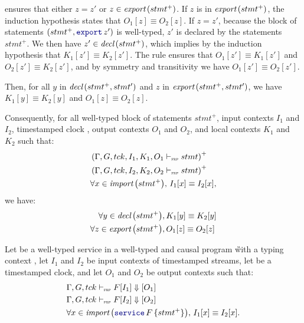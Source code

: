 \begin{skippableproof}
\begin{itemize}
\begin{itemize}
                         ensures that
                        either $z = z'$ or $z \in \exportSet{stmt^+}$.
                        If $z$ is in $\exportSet{stmt^+}$, the induction hypothesis states that
                        $O_1[z] \equiv O_2[z]$.
                        If $z = z'$, because the block of statements $(stmt^+, \export{z'})$ is
                        well-typed, $z'$ is declared by the statements $stmt^+$. We then have $z'
                            \in \declSet{stmt^+}$, which implies by the induction hypothesis that
                        $K_1[z'] \equiv K_2[z']$. The rule  ensures that $O_1[z'] \equiv K_1[z']$ and $O_2[z'] \equiv
                            K_2[z']$, and by symmetry and transitivity we have $O_1[z'] \equiv
                            O_2[z']$.
              \end{itemize}

              Then, for all $y$ in $\declSet{stmt^+, stmt'}$ and $z$ in $\exportSet{stmt^+, stmt'}$,
              we have $K_1[y] \equiv K_2[y]$ and $O_1[z] \equiv O_2[z]$.
    \end{itemize}

    Consequently, for all well-typed block of statements $stmt^+$, input contexts $I_1$ and $I_2$,
    timestamped clock \tck, output contexts $O_1$ and $O_2$, and local contexts $K_1$ and $K_2$ such
    that:
    \begin{align*}
         & \left(\stmtDenot{\tck}{I_1}{K_1}{stmt}{O_1}\right)^+       \\
         & \left(\stmtDenot{\tck}{I_2}{K_2}{stmt}{O_2}\right)^+       \\
         & \forall x \in \importSet{stmt^+}, \, I_1[x] \equiv I_2[x],
    \end{align*}
    we have:
    \begin{align}
        \forall y \in \declSet{stmt^+},   & \, K_1[y] \equiv K_2[y] \label{eq:semantics:grfrp:theorems:determinism:aux:1} \\
        \forall z \in \exportSet{stmt^+}, & \, O_1[z] \equiv O_2[z] \label{eq:semantics:grfrp:theorems:determinism:aux:2}
    \end{align}

    Let  be a well-typed service in a well-typed and causal program \G with a
    typing context \tyCtx, let $I_1$ and $I_2$ be input contexts of timestamped streams, let
    \tck be a timestamped clock, and let $O_1$ and $O_2$ be output contexts such that:
    \begin{align*}
         & \serviceDenot{\tck}{I_1}{F}{O_1}                                        \\
         & \serviceDenot{\tck}{I_2}{F}{O_2}                                        \\
         & \forall x \in \importSet{\service{F}{stmt^+}}, \, I_1[x] \equiv I_2[x].
    \end{align*}


\end{skippableproof}
